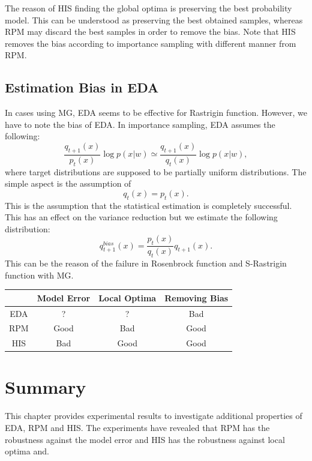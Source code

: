 The reason of HIS finding the global optima is
preserving the best probability model.
This can be understood as preserving the best obtained samples,
whereas RPM may discard the best samples in order to remove the bias.
Note that HIS removes the bias according to importance sampling
with different manner from RPM.


\subsection{Estimation Bias in EDA}
In cases using MG,
EDA seems to be effective for Rastrigin function.
However, we have to note the bias of EDA.
In importance sampling, EDA assumes the following:
\begin{equation}
 \frac{q_{t+1}(x)}{p_t(x)} \log p(x|w) \simeq 
 \frac{q_{t+1}(x)}{q_t(x)} \log p(x|w),
\end{equation} 
where target distributions are supposed to be 
partially uniform distributions.
The simple aspect is the assumption of
\begin{equation}
 q_t(x)=p_t(x).
\end{equation}
This is the assumption that
 the statistical estimation is completely successful.
This has an effect on the variance reduction but
we estimate the following distribution:
\begin{equation}
 q^{bias}_{t+1}(x)=\frac{p_t(x)}{q_t(x)}q_{t+1}(x).
\end{equation}
This can be the reason of the failure 
in Rosenbrock function and S-Rastrigin function
with MG.


\begin{table}
\centering
\begin{tabular}{|c|c|c|c|}
\hline 
&  Model Error & Local Optima & Removing Bias \\
\hline
EDA & ? & ? & Bad \\
\hline
RPM & Good & Bad & Good \\
\hline
HIS & Bad & Good & Good \\
\hline
\end{tabular}
\end{table}



\section{Summary}
This chapter provides experimental results to investigate
additional properties of EDA, RPM and HIS.
The experiments have revealed that
RPM has the robustness against the model error and
HIS has the robustness against local optima and.
